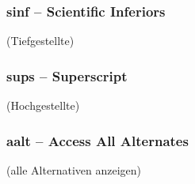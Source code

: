 \documentclass{fontdoku}
\begin{document}
\subsubsection*{sinf -- Scientific Inferiors} (Tiefgestellte)
\subsubsection*{sups -- Superscript} (Hochgestellte)
\subsubsection*{aalt -- Access All Alternates} (alle Alternativen anzeigen)


%
%
%
%
%
\end{document}
